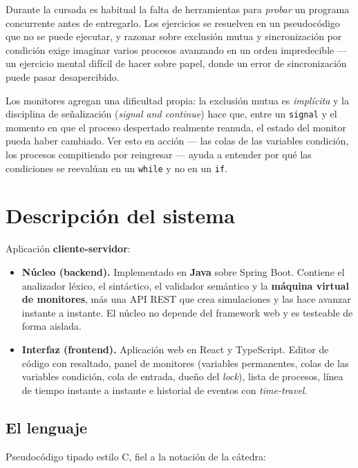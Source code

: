 \documentclass[11pt,a4paper]{article}
\begin{document}
Durante la cursada es habitual la falta de herramientas para \emph{probar} un programa
concurrente antes de entregarlo. Los ejercicios se resuelven en un pseudocódigo que no se
puede ejecutar, y razonar sobre exclusión mutua y sincronización por condición exige
imaginar varios procesos avanzando en un orden impredecible --- un ejercicio mental difícil
de hacer sobre papel, donde un error de sincronización puede pasar desapercibido.

Los monitores agregan una dificultad propia: la exclusión mutua es \emph{implícita} y la
disciplina de señalización (\emph{signal and continue}) hace que, entre un \texttt{signal} y
el momento en que el proceso despertado realmente reanuda, el estado del monitor pueda haber
cambiado. Ver esto en acción --- las colas de las variables condición, los procesos
compitiendo por reingresar --- ayuda a entender por qué las condiciones se reevalúan en un
\texttt{while} y no en un \texttt{if}.

\section{Descripción del sistema}

Aplicación \textbf{cliente-servidor}:

\begin{itemize}[leftmargin=1.4em]
  \item \textbf{Núcleo (backend).} Implementado en \textbf{Java} sobre Spring Boot. Contiene
        el analizador léxico, el sintáctico, el validador semántico y la \textbf{máquina
        virtual de monitores}, más una API REST que crea simulaciones y las hace avanzar
        instante a instante. El núcleo no depende del framework web y es testeable de forma
        aislada.
  \item \textbf{Interfaz (frontend).} Aplicación web en React y TypeScript. Editor de
        código con resaltado, panel de monitores (variables permanentes, colas de las
        variables condición, cola de entrada, dueño del \emph{lock}), lista de procesos,
        línea de tiempo instante a instante e historial de eventos con \emph{time-travel}.
\end{itemize}

\subsection{El lenguaje}

Pseudocódigo tipado estilo C, fiel a la notación de la cátedra:
\end{document}
